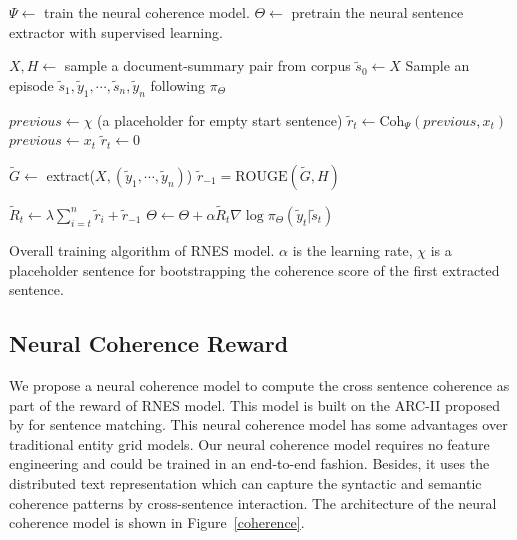 \documentclass[letterpaper]{article} \usepackage{aaai18}  \usepackage{times}  \usepackage{helvet}  \usepackage{courier}  \usepackage{url}  \usepackage{graphicx}  \usepackage{amssymb}
\begin{document}
	\begin{algorithm}[t]
		\small
		\begin{algorithmic}[1]
			\State $\Psi \leftarrow$ train the neural coherence model.
			\State $\Theta \leftarrow$ pretrain the neural sentence extractor with supervised learning.
			
			\Loop
			
			\State $X, H \leftarrow$ sample a document-summary pair from corpus
			\State $\tilde{s}_0 \leftarrow X$
			\State Sample an episode $\tilde{s}_1, \tilde{y}_1, \cdots, \tilde{s}_n, \tilde{y}_n$ following $\pi_{\Theta}$
			
			\State $previous \leftarrow \chi$ (a placeholder for empty start sentence)
			\State $\tilde{r}_t \leftarrow \text{Coh}_{\Psi}(previous, x_t)$
			\State $previous \leftarrow x_t$
			\Else
			\State $\tilde{r}_t \leftarrow 0 $
			\EndIf
			\EndFor
			
			
			\State $\tilde{G} \leftarrow$ extract($X, (\tilde{y}_1, \cdots, \tilde{y}_n)$)
			\State $\tilde{r}_{-1} = \text{ROUGE}(\tilde{G}, H)$
			
			\State $\tilde{R}_t \leftarrow \lambda \sum_{i=t}^{n} \tilde{r}_i + \tilde{r}_{-1}$
			\State $\Theta \leftarrow \Theta + \alpha \tilde{R}_t \nabla \log \pi_{\Theta}(\tilde{y}_t|\tilde{s}_t)$
			\EndFor
			
			\EndLoop
			
		\end{algorithmic}
		\caption{Overall training algorithm of RNES model. $\alpha$ is the learning rate, $\chi$ is a placeholder sentence for bootstrapping the coherence score of the first extracted sentence.}
		\label{algo_rnes}
	\end{algorithm}


	\subsection{Neural Coherence Reward}
	\label{ncr}
	We propose a neural coherence model to compute the cross sentence coherence as part of the reward of RNES model. This model is built on the ARC-II proposed by \cite{NIPS2014_hu} for sentence matching. This neural coherence model has some advantages over traditional entity grid models. Our neural coherence model requires no feature engineering and could be trained in an end-to-end fashion. Besides, it uses the distributed text representation which can capture the syntactic and semantic coherence patterns by cross-sentence interaction. The architecture of the neural coherence model is shown in Figure~\ref{coherence}. 
\end{document}
